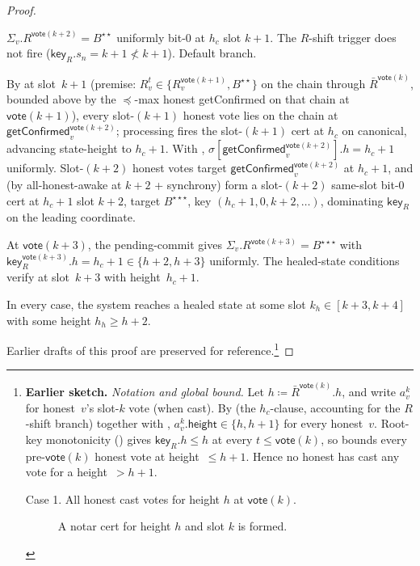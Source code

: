 \ifx\litemode\undefined\documentclass{article}\fi
\newcommand{\height}{\mathsf{height}}
\newcommand{\key}{\mathsf{key}}
\newcommand{\vote}{\mathsf{vote}}
\newcommand{\comm}[1]{\bar{#1}}
\newcommand{\getConfirmed}{\textsf{getConfirmed}\xspace}
\theoremstyle{plain}
\theoremstyle{definition}
\theoremstyle{remark}
\newcommand{\AHA}{all-honest-awake\xspace}
\begin{document}
\begin{proof}
\begin{description}
\begin{description}
$\Sigma_v.R^{\vote(k+2)} = B^{\star\star}$ uniformly bit-$0$ at $h_c$ slot $k+1$. The $R$-shift trigger does not fire ($\key_R.s_n = k+1 \not< k+1$). Default branch.

By  at slot~$k+1$ (premise: $R_v^t \in \{R_v^{\vote(k+1)}, B^{\star\star}\}$ on the chain through $\comm{R}^{\vote(k)}$, bounded above by the $\preceq$-max honest \getConfirmed{} on that chain at $\vote(k+1)$), every slot-$(k+1)$ honest vote lies on the chain at $\getConfirmed_v^{\vote(k+2)}$; processing fires the slot-$(k+1)$ cert at $h_c$ on canonical, advancing state-height to $h_c + 1$. With , $\sigma[\getConfirmed_v^{\vote(k+2)}].h = h_c + 1$ uniformly. Slot-$(k+2)$ honest votes target $\getConfirmed_v^{\vote(k+2)}$ at $h_c + 1$, and (by \AHA at $k+2$ + synchrony) form a slot-$(k+2)$ same-slot bit-$0$ cert at $h_c + 1$ slot $k+2$, target $B^{\star\star\star}$, key $(h_c+1, 0, k+2, \ldots)$, dominating $\key_R$ on the leading coordinate.

At $\vote(k+3)$, the pending-commit gives $\Sigma_v.R^{\vote(k+3)} = B^{\star\star\star}$ with $\key_R^{\vote(k+3)}.h = h_c + 1 \in \{h+2, h+3\}$ uniformly. The healed-state conditions verify at slot~$k+3$ with height~$h_c + 1$.
\end{description}
\end{description}

In every case, the system reaches a healed state at some slot $k_h \in [k+3, k+4]$ with some height $h_h \geq h+2$.

\noindent Earlier drafts of this proof are preserved for reference.\footnote{\textbf{Earlier sketch.} \emph{Notation and global bound.}
Let $h \coloneqq \comm{R}^{\vote(k)}.h$, and write $a^k_v$ for honest~$v$'s slot-$k$ vote (when cast). By  (the $h_c$-clause, accounting for the $R$-shift branch) together with , $a^k_v.\height \in \{h, h+1\}$ for every honest~$v$. Root-key monotonicity () gives $\key_R.h \leq h$ at every $t \leq \vote(k)$, so  bounds every pre-$\vote(k)$ honest vote at height~$\leq h+1$. Hence no honest has cast any vote for a height~$> h+1$.

\begin{description}
  \item[Case 1. All honest cast votes for height $h$ at $\vote(k)$.]
  A notar cert for height $h$ and slot $k$ is formed.
  

\end{description}}
\end{proof}
\end{document}
